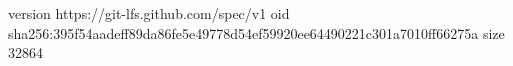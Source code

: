 version https://git-lfs.github.com/spec/v1
oid sha256:395f54aadeff89da86fe5e49778d54ef59920ee64490221c301a7010ff66275a
size 32864
